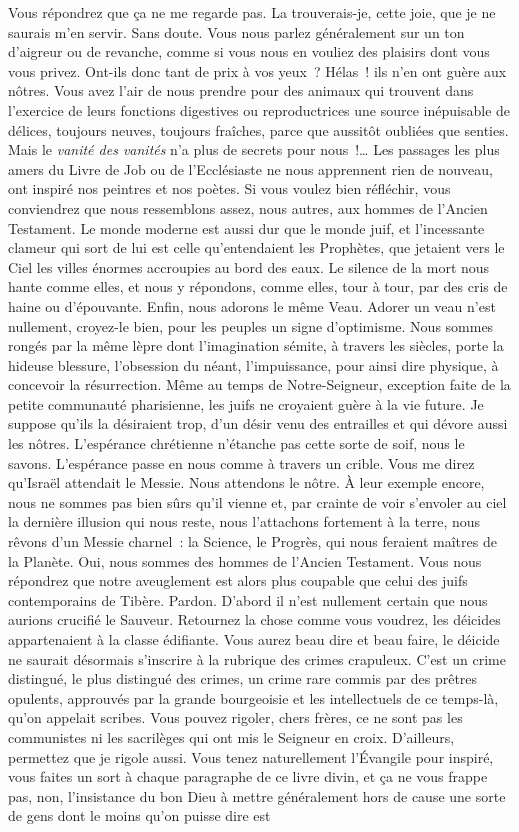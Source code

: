 \documentclass[french,twoside]{book} %
\begin{document}
Vous répondrez que ça ne me regarde pas. La trouverais-je, cette joie, que je ne saurais m’en servir. Sans doute. Vous nous parlez généralement sur un ton d’aigreur ou de revanche, comme si vous nous en vouliez des plaisirs dont vous vous privez. Ont-ils donc tant de prix à vos yeux ? Hélas ! ils n’en ont guère aux nôtres. Vous avez l’air de nous prendre pour des animaux qui trouvent dans l’exercice de leurs fonctions digestives ou reproductrices une source inépuisable de délices, toujours neuves, toujours fraîches, parce que aussitôt oubliées que senties. Mais le \emph{vanité des vanités} n’a plus de secrets pour nous !… Les passages les plus amers du Livre de Job ou de l’Ecclésiaste ne nous apprennent rien de nouveau, ont inspiré nos peintres et nos poètes. Si vous voulez bien réfléchir, vous conviendrez que nous ressemblons assez, nous autres, aux hommes de l’Ancien Testament. Le monde moderne est aussi dur que le monde juif, et l’incessante clameur qui sort de lui est celle qu’entendaient les Prophètes, que jetaient vers le Ciel les villes énormes accroupies au bord des eaux. Le silence de la mort nous hante comme elles, et nous y répondons, comme elles, tour à tour, par des cris de haine ou d’épouvante. Enfin, nous adorons le même Veau. Adorer un veau n’est nullement, croyez-le bien, pour les peuples un signe d’optimisme. Nous sommes rongés par la même lèpre dont l’imagination sémite, à travers les siècles, porte la hideuse blessure, l’obsession du néant, l’impuissance, pour ainsi dire physique, à concevoir la résurrection. Même au temps de Notre-Seigneur, exception faite de la petite communauté pharisienne, les juifs ne croyaient guère à la vie future. Je suppose qu’ils la désiraient trop, d’un désir venu des entrailles et qui dévore aussi les nôtres. L’espérance chrétienne n’étanche pas cette sorte de soif, nous le savons. L’espérance passe en nous comme à travers un crible. Vous me direz qu’Israël attendait le Messie. Nous attendons le nôtre. À leur exemple encore, nous ne sommes pas bien sûrs qu’il vienne et, par crainte de voir s’envoler au ciel la dernière illusion qui nous reste, nous l’attachons fortement à la terre, nous rêvons d’un Messie charnel : la Science, le Progrès, qui nous feraient maîtres de la Planète. Oui, nous sommes des hommes de l’Ancien Testament. Vous nous répondrez que notre aveuglement est alors plus coupable que celui des juifs contemporains de Tibère. Pardon. D’abord il n’est nullement certain que nous aurions crucifié le Sauveur. Retournez la chose comme vous voudrez, les déicides appartenaient à la classe édifiante. Vous aurez beau dire et beau faire, le déicide ne saurait désormais s’inscrire à la rubrique des crimes crapuleux. C’est un crime distingué, le plus distingué des crimes, un crime rare commis par des prêtres opulents, approuvés par la grande bourgeoisie et les intellectuels de ce temps-là, qu’on appelait scribes. Vous pouvez rigoler, chers frères, ce ne sont pas les communistes ni les sacrilèges qui ont mis le Seigneur en croix. D’ailleurs, permettez que je rigole aussi. Vous tenez naturellement l’Évangile pour inspiré, vous faites un sort à chaque paragraphe de ce livre divin, et ça ne vous frappe pas, non, l’insistance du bon Dieu à mettre généralement hors de cause une sorte de gens dont le moins qu’on puisse dire est 
\end{document}
